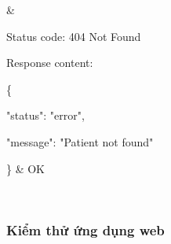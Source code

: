 \begin{enumerate}[a)]
\begin{xltabular}{\textwidth}
   &
  
    Status code: 404 Not Found
  
      Response content:
  
      \{
  
    "status": "error",
  
    "message": "Patient not found"
  
    \}
    & OK
  
    \\ \hline

  
    \end{xltabular}

\end{enumerate}

\subsubsection{Kiểm thử ứng dụng web}

